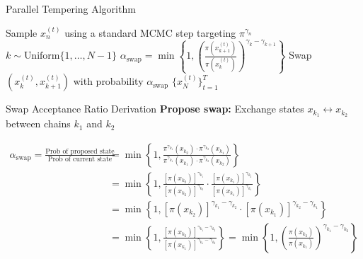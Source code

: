 \begin{frame}{Parallel Tempering Algorithm}
	\begin{algorithm}[H]
		\caption{Parallel Tempering MCMC}
		\begin{algorithmic}[1]
			\STATE Sample $x_n^{(t)}$ using a standard MCMC step targeting $\pi^{\gamma_n}$
			\ENDFOR
			\STATE $k \sim \text{Uniform}\{1, \ldots, N-1\}$
			\STATE $\alpha_{\text{swap}} = \min\left\{1, \left(\frac{\pi(x_{k+1}^{(t)})}{\pi(x_k^{(t)})}\right)^{\gamma_k - \gamma_{k+1}}\right\}$
			\STATE Swap $(x_k^{(t)}, x_{k+1}^{(t)})$ with probability $\alpha_{\text{swap}}$
			\ENDFOR
			\RETURN $\{x_N^{(t)}\}_{t=1}^T$
		\end{algorithmic}
	\end{algorithm}
\end{frame}

\begin{frame}{Swap Acceptance Ratio Derivation}
	\textbf{Propose swap:} Exchange states $x_{k_1} \leftrightarrow x_{k_2}$ between chains $k_1$ and $k_2$

	\begin{align*}
		\alpha_{\text{swap}} = \frac{\text{Prob of proposed state}}{\text{Prob of current state}} & = \min\left\{1, \frac{\pi^{\gamma_{k_1}}(x_{k_2}) \cdot \pi^{\gamma_{k_2}}(x_{k_1})}{\pi^{\gamma_{k_1}}(x_{k_1}) \cdot \pi^{\gamma_{k_2}}(x_{k_2})}\right\}           \\
		                     & = \min\left\{1, \frac{[\pi(x_{k_2})]^{\gamma_{k_1}}}{[\pi(x_{k_2})]^{\gamma_{k_2}}} \cdot \frac{[\pi(x_{k_1})]^{\gamma_{k_2}}}{[\pi(x_{k_1})]^{\gamma_{k_1}}}\right\} \\
		                     & = \min\left\{1, [\pi(x_{k_2})]^{\gamma_{k_1} - \gamma_{k_2}} \cdot [\pi(x_{k_1})]^{\gamma_{k_2} - \gamma_{k_1}}\right\}                                               \\
		                     & = \min\left\{1, \frac{[\pi(x_{k_2})]^{\gamma_{k_1} - \gamma_{k_2}}}{[\pi(x_{k_1})]^{\gamma_{k_1} - \gamma_{k_2}}}\right\}
		= \min\left\{1, \left(\frac{\pi(x_{k_2})}{\pi(x_{k_1})}\right) ^{\gamma_{k_1} - \gamma_{k_2}}    \right\}
	\end{align*}
\end{frame}

